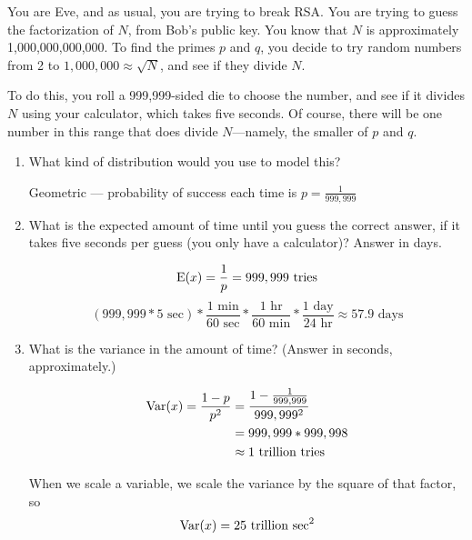 \question You are Eve, and as usual, you are trying to break RSA. 
You are trying to guess the factorization of $N$, from Bob’s public 
key. You know that $N$ is approximately 1,000,000,000,000. To find the 
primes $p$ and $q$, you decide to try random numbers from 2 to 
$1,000,000 \approx \sqrt{N}$, and see if they divide $N$.

To do this, you roll a 999,999-sided die to choose the number, and see 
if it divides $N$ using your calculator, which takes five seconds. Of 
course, there will be one number in this range that does divide $N$—namely, 
the smaller of $p$ and $q$.
\begin{enumerate}[label=(\alph*)]
\item What kind of distribution would you use to model this?
\begin{solution}[1cm]
Geometric — probability of success each time is $p = \frac{1}{999,999}$
\end{solution}

\item What is the expected amount of time until you guess the correct 
answer, if it takes five seconds per guess (you only have a calculator)? 
Answer in days.
		\begin{solution}[2cm]
\[\text{E}(x) = \frac{1}{p} = 999,999 \text{ tries}\]
		\[(999,999 * 5 \text{ sec}) * \frac{1 \text{ min}}{60 \text{ sec}} * \frac{1 \text{ hr}}{60 \text{ min}} * \frac{1 \text{ day}}{24 \text{ hr}} \approx 57.9 \text{ days}\]
\end{solution}

\item What is the variance in the amount of time? (Answer in seconds, 
approximately.)
\begin{solution}[2cm]
\begin{equation}
\begin{split}
\text{Var}(x) = \frac{1-p}{p^2} \nonumber
&= \frac{1-\frac{1}{999,999}}{999,999^2}  \\
&= 999,999 * 999,998 \\
&\approx 1 \text{ trillion tries}
\end{split}
\end{equation}

When we scale a variable, we scale the variance by the square of that 
factor, so 
\[\text{Var}(x) = 25 \text{ trillion sec}^2\]
\end{solution}
\end{enumerate}